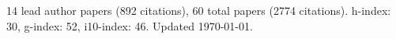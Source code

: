 14 lead author papers (892 citations),
60 total papers (2774 citations).\newline
h-index: 30, g-index: 52, i10-index: 46. Updated \today.